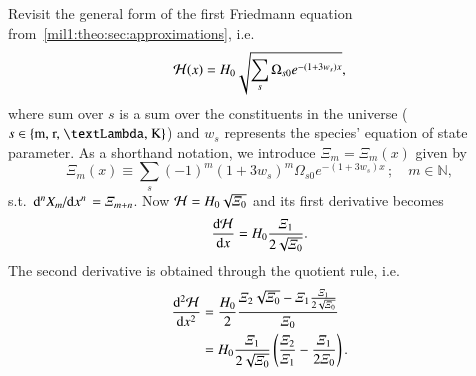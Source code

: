 



Revisit the general form of the first Friedmann equation from~\cref{mil1:theo:sec:approximations}, i.e.
\begin{equation}\label{app:hubble_derivatives:eq:Hp_of_x}
    \mathcal{H}(x) = H_0 \sqrt{\sum_{s}\Omega_{s0}e^{-(1+3w_s)x}},
\end{equation}
where sum over $s$ is a sum over the constituents in the universe ($s\in\left\{\text{m, r, \textLambda, K} \right\}$) and $w_s$ represents the species' equation of state parameter. As a shorthand notation, we introduce $\varXi_m = \varXi_m(x)$ given by
\begin{equation}\label{app:hubble_derivatives:eq:Xi_of_x}
    \varXi_{m}(x)\equiv \sum_{s} (-1)^m(1+3w_s)^m \Omega_{s0}e^{-(1+3w_s)x} \,; \quad m\in\mathbb{N},
\end{equation}
s.t. $\dv*[n]{X_m}{x} = \varXi_{m+n}$. Now $\mathcal{H} = H_0\sqrt{\varXi_0}$ and its first derivative becomes
\begin{equation}\label{app:hubble_derivatives:eq:dHp_dx}
    \dv{\mathcal{H}}{x} = H_0 \frac{\varXi_1}{2\sqrt{\varXi_0}}.
\end{equation}
The second derivative is obtained through the quotient rule, i.e.
\begin{equation}\label{app:hubble_derivatives:eq:ddHp_dxx}
    \begin{split}
    \dv[2]{\mathcal{H}}{x} &= \frac{H_0}{2} \frac{\varXi_2\sqrt{\varXi_0} - \varXi_1\frac{\varXi_1}{2\sqrt{\varXi_0}}}{\varXi_0} \\
    &= H_0\frac{\varXi_1} {2\sqrt{\varXi_0}}\left(  \frac{\varXi_2}{\varXi_1}- \frac{\varXi_1}{2\varXi_0} \right).
    \end{split}
\end{equation}


